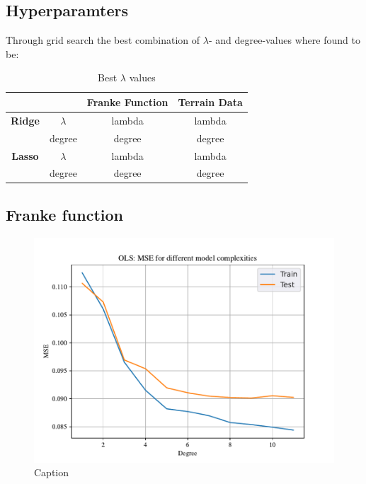 
\subsection{Hyperparamters}

Through grid search the best combination of $\lambda$- and degree-values where found to be: 

\begin{table}[h!]
    \centering
    \begin{tabular}{|c|c|c|c|}
        \hline
        & & \textbf{Franke Function} & \textbf{Terrain Data} \\ \hline
        \textbf{Ridge} & $\lambda$ & lambda & lambda \\ 
         & degree & degree & degree \\ \hline
        \textbf{Lasso} & $\lambda$ & lambda & lambda \\ 
         & degree & degree & degree \\ \hline
    \end{tabular}
    \caption{Best $\lambda$ values}
    \label{tab:my_label}
\end{table}

\subsection{Franke function}

\begin{figure}[h!]
    \centering
    \includegraphics[width=1\linewidth]{project_1_alt/figures/data/OLS_MSE_Franke_Noise.pdf}
    \caption{Caption}
    \label{fig:mseols}
\end{figure}

